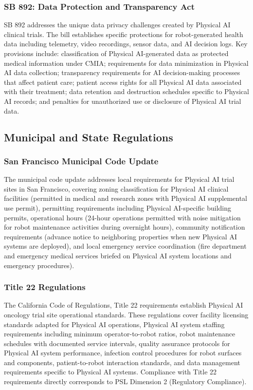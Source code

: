 \subsubsection{SB 892: Data Protection and Transparency Act}

SB 892 addresses the unique data privacy challenges created by Physical AI
clinical trials. The bill establishes specific protections for robot-generated
health data including telemetry, video recordings, sensor data, and AI decision
logs. Key provisions include: classification of Physical AI-generated data as
protected medical information under CMIA; requirements for data minimization in
Physical AI data collection; transparency requirements for AI decision-making
processes that affect patient care; patient access rights for all Physical AI
data associated with their treatment; data retention and destruction schedules
specific to Physical AI records; and penalties for unauthorized use or
disclosure of Physical AI trial data.

\subsection{Municipal and State Regulations}
\label{subsec:site-regulations}

\subsubsection{San Francisco Municipal Code Update}

The municipal code update addresses local requirements for Physical AI trial
sites in San Francisco, covering zoning classification for Physical AI clinical
facilities (permitted in medical and research zones with Physical AI
supplemental use permit), permitting requirements including Physical AI-specific
building permits, operational hours (24-hour operations permitted with noise
mitigation for robot maintenance activities during overnight hours), community
notification requirements (advance notice to neighboring properties when new
Physical AI systems are deployed), and local emergency service coordination
(fire department and emergency medical services briefed on Physical AI system
locations and emergency procedures).

\subsubsection{Title 22 Regulations}

The California Code of Regulations, Title 22 requirements establish Physical AI
oncology trial site operational standards. These regulations cover facility
licensing standards adapted for Physical AI operations, Physical AI system
staffing requirements including minimum operator-to-robot ratios, robot
maintenance schedules with documented service intervals, quality assurance
protocols for Physical AI system performance, infection control procedures for
robot surfaces and components, patient-to-robot interaction standards, and
data management requirements specific to Physical AI systems. Compliance with
Title 22 requirements directly corresponds to PSL Dimension 2 (Regulatory
Compliance).

